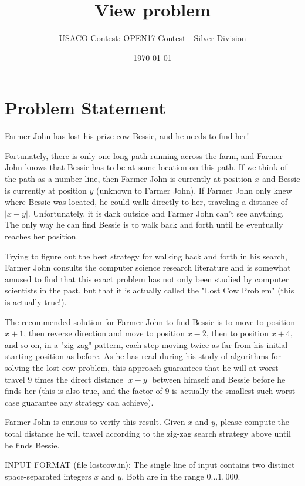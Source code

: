 \documentclass[12pt]{article}
\title{View problem}
\author{USACO Contest: OPEN17 Contest - Silver Division}
\date{\today}
\begin{document}
\maketitle

\section*{Problem Statement}

Farmer John has lost his prize cow Bessie, and he needs to find her!

Fortunately, there is only one long path running across the farm, and Farmer
John knows that Bessie has to be at some location on this path.  If we think of
the path as a number line, then Farmer John is currently at position $x$ and
Bessie is currently at position $y$ (unknown to Farmer John).  If Farmer John
only knew where Bessie was located, he could walk directly to her, traveling a
distance of $|x - y|$.  Unfortunately, it is dark outside and Farmer John can't
see anything.  The only way he can find Bessie is to walk back and forth until
he eventually reaches her position.

Trying to figure out the best strategy for walking back and forth in his search,
Farmer John consults the computer science research literature and is
somewhat amused to find that this exact problem has not only been studied by
computer scientists in the past, but that it is actually called the "Lost Cow
Problem" (this is actually true!).

The recommended solution for Farmer John to find Bessie is to move to position
$x+1$, then reverse direction and move to position $x-2$, then to position
$x+4$, and so on, in a  "zig zag" pattern, each step moving twice as far from
his initial starting position as before.  As he has read during his study of algorithms
for solving the lost cow problem, this approach guarantees that he will at worst
travel 9 times the direct distance $|x-y|$ between himself and Bessie before he
finds her (this is also true, and the factor of 9 is actually the smallest such
worst case guarantee any strategy can achieve).

Farmer John is curious to verify this result.  Given $x$ and $y$, please compute
the  total distance he will travel according to the zig-zag search strategy above
until he finds Bessie.

INPUT FORMAT (file lostcow.in):
The single line of input contains two distinct space-separated integers $x$ and
$y$.  Both are in the range $0 \ldots 1,000$.
\end{document}
